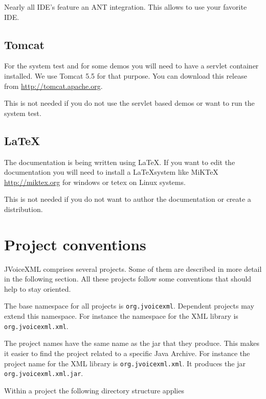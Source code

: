 \documentclass[11pt,a4paper]{article}
\begin{document}
Nearly all IDE's feature an ANT integration. This allows to use
your favorite IDE.

\subsection{Tomcat}
\label{sec:tomcat}

For the system test and for some demos you will need to have a servlet
container installed. We use Tomcat 5.5 for that purpose. You can download this
release from \url{http://tomcat.apache.org}.

This is not needed if you do not use the servlet based demos or want to run the
system test.

\subsection{\LaTeX}

The documentation is being written using \LaTeX. If you want to edit the
documentation you will need to install a \LaTeX system like MiKTeX
\url{http://miktex.org} for windows or tetex on Linux systems.

This is not needed if you do not want to author the documentation or create a
distribution.

\section{Project conventions}

JVoiceXML comprises several projects. Some of them are described in more
detail in the following section. All these projects follow some conventions
that should help to stay oriented.

The base namespace for all projects is \lstinline{org.jvoicexml}. Dependent 
projects may extend this namespace. For instance the namespace for the
XML library is \lstinline{org.jvoicexml.xml}.

The project names have the same name as the jar that they produce. This
makes it easier to find the project related to a specific Java Archive.
For instance the project name for the XML library is
\lstinline{org.jvoicexml.xml}. It produces the jar
\texttt{org.jvoicexml.xml.jar}.

Within a project the following directory structure applies
\end{document}
